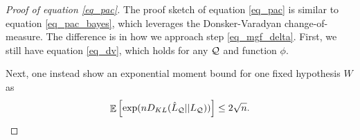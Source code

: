 \begin{proof}[Proof of equation \eqref{eq_pac}]
The proof sketch of equation \eqref{eq_pac} is similar to equation \eqref{eq_pac_bayes}, which leverages the Donsker-Varadyan change-of-measure.
The difference is in how we approach step \eqref{eq_mgf_delta}.
First, we still have equation \eqref{eq_dv}, which holds for any $\mathcal{Q}$ and function $\phi$.

Next, one instead show an exponential moment bound for one fixed hypothesis $W$ as 
\[ \mathop{\mathbb{E}}\left[  \exp(n D_{KL}(\hat L_{\mathcal{Q}} || L_{\mathcal{Q}}))  \right] \le 2 \sqrt n. \]


\end{proof}
